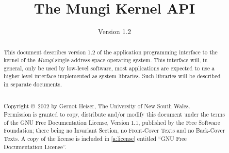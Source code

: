 \documentclass[a4paper,11pt,twoside,dvips]{report}
\newif	\ifDraft	\Draftfalse
\begin{document}
\ifDraft
   \newcommand{\DraftComment}[1]{{\bf\em #1}}
   \newcommand{\draftComment}[1]{\textbf{\emph{#1}}}
\else
   \newcommand{\DraftComment}[1]{\relax}
   \newcommand{\draftComment}[1]{\relax}
\fi
\newcommand{\Note}[1]{\par{\bf Note:} #1\par}
\newcommand{\Raise}[1]{&\multicolumn{2}{@{} l |}{|\RAISES #1|}}
\newcommand{\Fails}[1]{&\multicolumn{2}{@{} l |}{|\FAILS #1|}}
\newlength{\FailsLng}
\newcommand{\FailS}[1]{&\multicolumn{2}{@{} l |}
              {\settowidth{\FailsLng}{|\FAILS |}\hspace{\FailsLng}|#1|}}
\newcommand{\Never}{&\multicolumn{2}{@{} l |}{\bf never fails}}
\newcommand{\Ret}{\(\AR\)}			%
\newcommand{\Cite}[1]{\relax}	%
\renewcommand{\topfraction}{0.95}
\renewcommand{\bottomfraction}{0.95}
\renewcommand{\textfraction}{0.05}


\title{The Mungi Kernel API}
\author{Version 1.2}
\date{\ifDraft Draft of \fi\RCSDate\ifDraft, document revision \RCSRevision\fi}
\maketitle
\thispagestyle{empty}
\pagestyle{headings}

\vfill
\begin{abstract}
\setcounter{page}{2}
This document describes version 1.2 of the application
programming interface to the kernel of the \emph{Mungi}
single-address-space operating system. This interface will, in general,
only be used by low-level software, most applications are expected to
use a higher-level interface implemented as system libraries. Such
libraries will be described in separate documents.

\vfill
\noindent\hrulefill\\
%
Copyright \copyright~2002 by Gernot Heiser, The University of New
South Wales.\\
Permission is granted to copy, distribute and/or modify this document
under the terms of the GNU Free Documentation License, Version 1.1,
published by the Free Software Foundation; there
being no Invariant Section, no Front-Cover Texts and no Back-Cover
Texts.  A copy of
the license is included in \autoref{a:license} entitled ``GNU Free
Documentation License''.\\[2ex]
%

\end{abstract}
\end{document}
